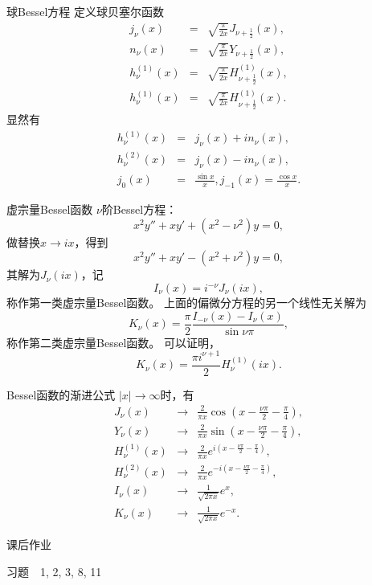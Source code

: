 \documentclass[11pt]{beamer}
\begin{document}
\begin{frame}{球Bessel方程}
定义球贝塞尔函数
\begin{eqnarray}
j_\nu(x) &=& \sqrt{ \frac{\pi}{2x} } J_{\nu+\frac{1}{2}}(x), \\
n_\nu(x) &=& \sqrt{ \frac{\pi}{2x} } Y_{\nu+\frac{1}{2}}(x), \\
h^{(1)}_\nu(x) &=& \sqrt{ \frac{\pi}{2x} } H^{(1)}_{\nu+\frac{1}{2}}(x), \\
h^{(1)}_\nu(x) &=& \sqrt{ \frac{\pi}{2x} } H^{(1)}_{\nu+\frac{1}{2}}(x).
\end{eqnarray}
显然有
\begin{eqnarray}
h^{(1)}_\nu(x) &=& j_\nu(x) + i n_\nu(x), \\
h^{(2)}_\nu(x) &=& j_\nu(x) - i n_\nu(x), \\
j_0(x) &=& \frac{\sin x}{x}, j_{-1}(x) = \frac{\cos x}{x}.
\end{eqnarray}
\end{frame}

\begin{frame}{虚宗量Bessel函数}
$\nu$阶Bessel方程：
\begin{equation}
x^2 y'' + x y' + (x^2 - \nu^2) y = 0,
\end{equation}
做替换$x \rightarrow ix$，得到
\begin{equation}
x^2 y'' + x y' - (x^2 + \nu^2) y = 0,
\end{equation}
其解为$J_\nu(ix)$，记
\begin{equation}
I_\nu(x) = i^{-\nu} J_\nu(ix),
\end{equation}
称作第一类虚宗量Bessel函数。
上面的偏微分方程的另一个线性无关解为
\begin{equation}
K_\nu(x) = \frac{\pi}{2} \frac{I_{-\nu}(x) - I_\nu(x)}{\sin \nu \pi},
\end{equation}
称作第二类虚宗量Bessel函数。
可以证明，
\begin{equation}
K_\nu(x) = \frac{\pi i^{\nu+1}}{2} H^{(1)}_\nu(ix).
\end{equation}
\end{frame}

\begin{frame}{Bessel函数的渐进公式}
$|x| \rightarrow \infty$时，有
\begin{eqnarray}
J_\nu(x) & \rightarrow & \frac{2}{\pi x} \cos( x - \frac{\nu\pi}{2} - \frac{\pi}{4}), \\
Y_\nu(x) & \rightarrow & \frac{2}{\pi x} \sin( x - \frac{\nu\pi}{2} - \frac{\pi}{4}), \\
H^{(1)}_\nu(x) & \rightarrow & \frac{2}{\pi x} e^{i( x - \frac{\nu\pi}{2} - \frac{\pi}{4})}, \\
H^{(2)}_\nu(x) & \rightarrow & \frac{2}{\pi x} e^{-i( x - \frac{\nu\pi}{2} - \frac{\pi}{4})}, \\
I_\nu(x) & \rightarrow & \frac{1}{\sqrt{2\pi x}} e^x, \\
K_\nu(x) & \rightarrow & \frac{1}{\sqrt{2\pi x}} e^{-x}.
\end{eqnarray}
\end{frame}

\begin{frame}{课后作业}

习题　1, 2, 3, 8, 11

\end{frame}
\end{document}
